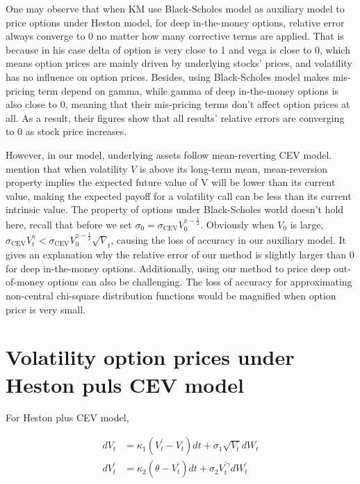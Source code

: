 One may observe that when KM use Black-Scholes model as auxiliary model to price options under Heston model, for deep in-the-money options, relative error always converge to 0 no matter how many corrective terms are applied. That is because in his case delta of option is very close to 1 and vega is close to 0, which means option prices are mainly driven by underlying stocks' prices, and volatility has no influence on option prices. Besides, using Black-Scholes model makes mis-pricing term depend on gamma, while gamma of deep in-the-money options is also close to 0, meaning that their mis-pricing terms don't affect option prices at all. As a result, their figures show that all results' relative errors are converging to 0 as stock price increases.

However, in our model, underlying assets follow mean-reverting CEV model. \cite{grunbichler_valuing_1996} mention that when volatility $V$ is above its long-term mean, mean-reversion property implies the expected future value of V will be lower than its current value, making the expected payoff for a volatility call can be less than its current intrinsic value. The property of options under Black-Scholes world doesn't hold here, recall that before we set $\sigma_0 = \sigma_{\text{CEV}}V_0^{\gamma-\frac{1}{2}}$. Obviously when $V_0$ is large, $\sigma_{\text{CEV}} V^{\gamma}_t < \sigma_{\text{CEV}}V_0^{\gamma-\frac{1}{2}} \sqrt{V}_t$, causing the loss of accuracy in our auxiliary model. It gives an explanation why the relative error of our method is slightly larger than 0 for deep in-the-money options. Additionally, using our method to price deep out-of-money options can also be challenging. The loss of accuracy for approximating non-central chi-square distribution functions would be magnified when option price is very small.


\section{Volatility option prices under Heston puls CEV model}

For Heston plus CEV model,

$$
\begin{aligned}
  d V_t &=\kappa_1 \left(V^{\prime}_t - V_t\right) d t+\sigma_{1} \sqrt{V_t} d W_t \\
  d V^{\prime}_t &=\kappa_2\left(\theta -V^{\prime}_t\right) d t+\sigma_{2} V^{\prime \gamma}_t d W^{\prime}_t
\end{aligned}
$$

